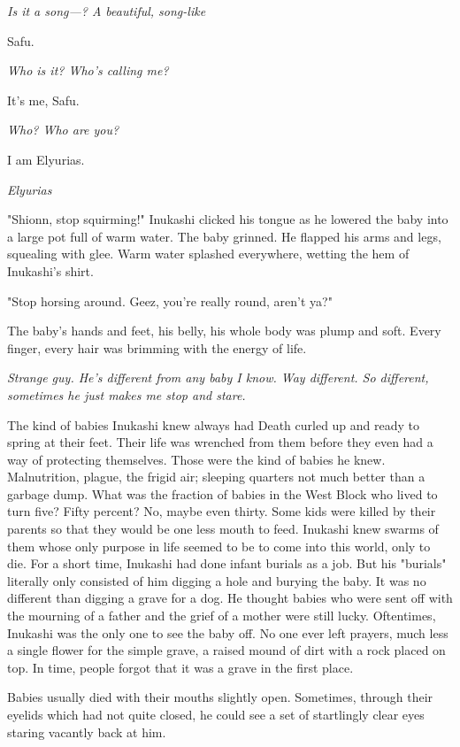 \emph{Is it a song---? A beautiful, song-like\el }

Safu.

\emph{Who is it? Who's calling me?}

It's me, Safu.

\emph{Who? Who are you?}

I am Elyurias.

\emph{Elyurias\el }

\mybreak

"Shionn, stop squirming!" Inukashi clicked his tongue as he lowered the
baby into a large pot full of warm water. The baby grinned. He flapped
his arms and legs, squealing with glee. Warm water splashed everywhere,
wetting the hem of Inukashi's shirt.

"Stop horsing around. Geez, you're really round, aren't ya?"

The baby's hands and feet, his belly, his whole body was plump and soft.
Every finger, every hair was brimming with the energy of life.

\emph{Strange guy. He's different from any baby I know. Way different. So
different, sometimes he just makes me stop and stare.}

The kind of babies Inukashi knew always had Death curled up and ready to
spring at their feet. Their life was wrenched from them before they even
had a way of protecting themselves. Those were the kind of babies he
knew. Malnutrition, plague, the frigid air; sleeping quarters not much
better than a garbage dump. What was the fraction of babies in the West
Block who lived to turn five? Fifty percent? No, maybe even thirty. Some
kids were killed by their parents so that they would be one less mouth
to feed. Inukashi knew swarms of them whose only purpose in life seemed
to be to come into this world, only to die. For a short time, Inukashi
had done infant burials as a job. But his "burials" literally only
consisted of him digging a hole and burying the baby. It was no
different than digging a grave for a dog. He thought babies who were
sent off with the mourning of a father and the grief of a mother were
still lucky. Oftentimes, Inukashi was the only one to see the baby off.
No one ever left prayers, much less a single flower for the simple
grave, a raised mound of dirt with a rock placed on top. In time, people
forgot that it was a grave in the first place.

Babies usually died with their mouths slightly open. Sometimes, through
their eyelids which had not quite closed, he could see a set of
startlingly clear eyes staring vacantly back at him.

